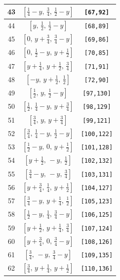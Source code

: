 \documentclass[fleqn,8pt]{jsarticle}
\begin{document}
\begin{longtable}{ccc}
43 & $\left[ \frac{1}{4} - y,\, \frac{3}{4},\, \frac{1}{2} - y \right]$ & {\tt [67,92]} \\ \hline
44 & $\left[ y,\, \frac{1}{2},\, \frac{1}{2} - y \right]$ & {\tt [68,89]} \\ \hline
45 & $\left[ 0,\, y + \frac{3}{4},\, \frac{3}{4} - y \right]$ & {\tt [69,86]} \\ \hline
46 & $\left[ 0,\, \frac{1}{2} - y,\, y + \frac{1}{2} \right]$ & {\tt [70,85]} \\ \hline
47 & $\left[ y + \frac{1}{4},\, y + \frac{1}{2},\, \frac{3}{4} \right]$ & {\tt [71,91]} \\ \hline
48 & $\left[ - y,\, y + \frac{1}{2},\, \frac{1}{2} \right]$ & {\tt [72,90]} \\ \hline
49 & $\left[ \frac{1}{2},\, y,\, \frac{1}{2} - y \right]$ & {\tt [97,130]} \\ \hline
50 & $\left[ \frac{1}{2},\, \frac{1}{4} - y,\, y + \frac{3}{4} \right]$ & {\tt [98,129]} \\ \hline
51 & $\left[ \frac{3}{4},\, y,\, y + \frac{3}{4} \right]$ & {\tt [99,121]} \\ \hline
52 & $\left[ \frac{3}{4},\, \frac{1}{4} - y,\, \frac{1}{2} - y \right]$ & {\tt [100,122]} \\ \hline
53 & $\left[ \frac{1}{2} - y,\, 0,\, y + \frac{1}{2} \right]$ & {\tt [101,128]} \\ \hline
54 & $\left[ y + \frac{1}{2},\, - y,\, \frac{1}{2} \right]$ & {\tt [102,132]} \\ \hline
55 & $\left[ \frac{3}{4} - y,\, - y,\, \frac{3}{4} \right]$ & {\tt [103,131]} \\ \hline
56 & $\left[ y + \frac{3}{4},\, \frac{1}{4},\, y + \frac{1}{2} \right]$ & {\tt [104,127]} \\ \hline
57 & $\left[ \frac{3}{4} - y,\, y + \frac{1}{4},\, \frac{1}{2} \right]$ & {\tt [105,123]} \\ \hline
58 & $\left[ \frac{1}{2} - y,\, \frac{1}{4},\, \frac{3}{4} - y \right]$ & {\tt [106,125]} \\ \hline
59 & $\left[ y + \frac{1}{2},\, y + \frac{1}{4},\, \frac{3}{4} \right]$ & {\tt [107,124]} \\ \hline
60 & $\left[ y + \frac{3}{4},\, 0,\, \frac{3}{4} - y \right]$ & {\tt [108,126]} \\ \hline
61 & $\left[ \frac{3}{4},\, - y,\, \frac{3}{4} - y \right]$ & {\tt [109,135]} \\ \hline
62 & $\left[ \frac{3}{4},\, y + \frac{1}{4},\, y + \frac{1}{2} \right]$ & {\tt [110,136]} \\ \hline

\end{longtable}
\end{document}
